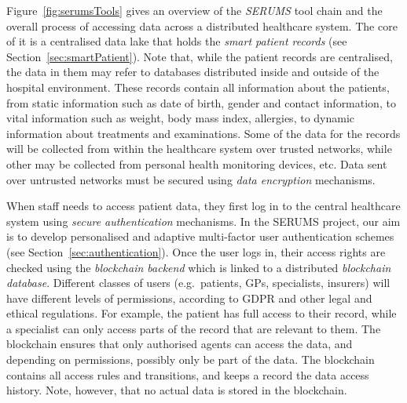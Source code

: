 \noindent Figure~\ref{fig:serumsTools} gives an overview of the \emph{SERUMS} tool chain and the overall process of accessing data across a distributed healthcare system. %
The core of it is a centralised data lake that holds the \emph{smart patient records} (see Section~\ref{sec:smartPatient}). Note that, while the patient records are centralised, the data in them may refer to databases distributed inside and outside of the hospital environment. These records contain all information about the patients, from static information such as date of birth, gender and contact information, to vital information such as weight, body mass index, allergies, to dynamic information about treatments and examinations. Some of the data for the records will be collected from within the healthcare system over trusted networks, while other may be collected from personal health monitoring devices, etc. Data sent over untrusted networks must be secured using \emph{data encryption} mechanisms.


When staff needs to access patient data, they first log in to the central healthcare system using \emph{secure authentication} mechanisms. In the SERUMS project, our aim is to develop personalised and adaptive multi-factor user authentication schemes (see Section~\ref{sec:authentication}). Once the user logs in, their access rights are checked using the \emph{blockchain backend} which is linked to a distributed \emph{blockchain database}. Different classes of users (e.g.~patients, GPs, specialists, insurers) will have different levels of permissions, according to GDPR and other legal and ethical regulations. For example, the patient has full access to their record, while a specialist can only access parts of the record that are relevant to them. The blockchain ensures that only authorised agents can access the data, and depending on permissions, possibly only be part of the data. The blockchain contains all access rules and transitions, and keeps a record the data access history. Note, however, that no actual data is stored in the blockchain.

